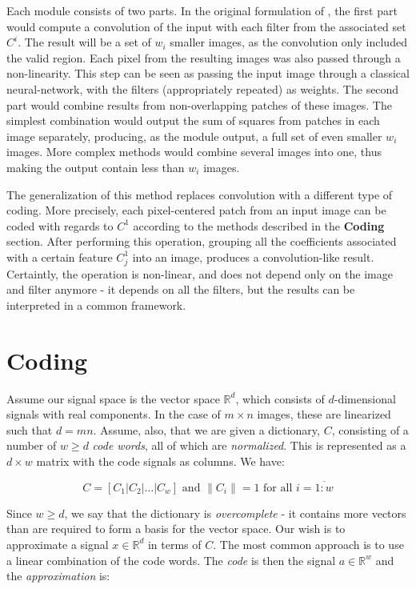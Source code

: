 \documentclass[runningheads,a4paper]{llncs}
\newcommand{\hctimes}[2]{{#1}\!\times\!{#2}}
\newcommand{\hcrange}[2]{\overline{{#1}\colon\!\!{#2}}}
\newcommand{\hcsignalspace}{\mathbb{R}^d}
\newcommand{\hcweightspace}{\mathbb{R}^w}
\begin{document}
Each module consists of two parts. In the original formulation of \cite{u1}, the first part would compute a convolution of the input with each filter from the associated set $C^i$. The result will be a set of $w_i$ smaller images, as the convolution only included the valid region. Each pixel from the resulting images was also passed through a non-linearity. This step can be seen as passing the input image through a classical neural-network, with the filters (appropriately repeated) as weights. The second part would combine results from non-overlapping patches of these images. The simplest combination would output the sum of squares from patches in each image separately, producing, as the module output, a full set of even smaller $w_i$ images. More complex methods would combine several images into one, thus making the output contain less than $w_i$ images.

The generalization of this method replaces convolution with a different type of coding. More precisely, each pixel-centered patch from an input image can be coded with regards to $C^1$ according to the methods described in the \textbf{Coding} section. After performing this operation, grouping all the coefficients associated with a certain feature $C^1_j$ into an image, produces a convolution-like result. Certaintly, the operation is non-linear, and does not depend only on the image and filter anymore - it depends on all the filters, but the results can be interpreted in a common framework.

\section{Coding}

Assume our signal space is the vector space $\hcsignalspace$, which consists of $d$-dimensional signals with real components. In the case of $\hctimes{m}{n}$ images, these are linearized such that $d = mn$. Assume, also, that we are given a dictionary, $C$, consisting of a number of $w \geq d$ \emph{code words}, all of which are \emph{normalized}. This is represented as a $\hctimes{d}{w}$ matrix with the code signals as columns. We have:

\begin{equation*}
C = \left[ C_1 \left|\right. C_2 \left|\right. \dots \left|\right. C_w \right] \text{~and~} \|C_i\| = 1 \text{~for all $i = \hcrange{1}{w}$}
\end{equation*}

Since $w \geq d$, we say that the dictionary is \emph{overcomplete} - it contains more vectors than are required to form a basis for the vector space. Our wish is to approximate a signal $x \in \hcsignalspace$ in terms of $C$. The most common approach is to use a linear combination of the code words. The \emph{code} is then the signal $a \in \hcweightspace$ and the \emph{approximation} is:
\end{document}
